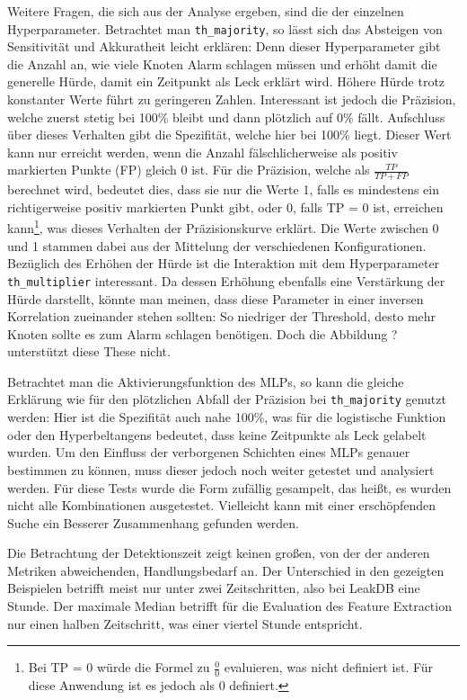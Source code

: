 Weitere Fragen, die sich aus der Analyse ergeben, sind die der einzelnen Hyperparameter. Betrachtet man
 \texttt{th\_majority}, so lässt sich das Absteigen von Sensitivität und Akkuratheit leicht erklären: Denn dieser
 Hyperparameter gibt die Anzahl an, wie viele Knoten Alarm schlagen müssen und erhöht damit die generelle Hürde,
 damit ein Zeitpunkt als Leck erklärt wird. Höhere Hürde trotz konstanter Werte führt zu geringeren Zahlen.
 Interessant ist jedoch die Präzision, welche zuerst stetig bei 100\% bleibt und dann plötzlich auf 0\%
 fällt. Aufschluss über dieses Verhalten gibt die Spezifität, welche hier bei 100\% liegt. Dieser Wert kann
 nur erreicht werden, wenn die Anzahl fälschlicherweise als positiv markierten Punkte (FP) gleich 0 ist.
 Für die Präzision, welche als $\frac{TP}{TP+FP}$ berechnet wird, bedeutet dies, dass sie nur die Werte 1, falls
 es mindestens ein richtigerweise positiv markierten Punkt gibt, oder 0, falls TP = 0 ist, erreichen
 kann\footnote{Bei TP = 0 würde die Formel zu $\frac{0}{0}$ evaluieren, was nicht definiert ist. Für diese Anwendung
 ist es jedoch als 0 definiert.}, was dieses Verhalten der Präzisionskurve erklärt. Die Werte zwischen 0 und 1
 stammen dabei aus der Mittelung der verschiedenen Konfigurationen. Bezüglich des Erhöhen der Hürde ist die
 Interaktion mit dem Hyperparameter \texttt{th\_multiplier} interessant. Da dessen Erhöhung ebenfalls eine
 Verstärkung der Hürde darstellt, könnte man meinen, dass diese Parameter in einer inversen Korrelation
 zueinander stehen sollten: So niedriger der Threshold, desto mehr Knoten sollte es zum Alarm schlagen
 benötigen. Doch die Abbildung ? unterstützt diese These nicht.

Betrachtet man die Aktivierungsfunktion des MLPs, so kann die gleiche Erklärung wie für den plötzlichen Abfall
 der Präzision bei \texttt{th\_majority} genutzt werden: Hier ist die Spezifität auch nahe 100\%, was für die
 logistische Funktion oder den Hyperbeltangens bedeutet, dass keine Zeitpunkte als Leck gelabelt wurden. Um
 den Einfluss der verborgenen Schichten eines MLPs genauer bestimmen zu können, muss dieser jedoch noch weiter
 getestet und analysiert werden. Für diese Tests wurde die Form zufällig gesampelt, das heißt, es wurden nicht
 alle Kombinationen ausgetestet. Vielleicht kann mit einer erschöpfenden Suche ein Besserer Zusammenhang
 gefunden werden.

Die Betrachtung der Detektionszeit zeigt keinen großen, von der der anderen Metriken abweichenden,
 Handlungsbedarf an. Der Unterschied in den gezeigten Beispielen betrifft meist nur unter zwei Zeitschritten,
 also bei LeakDB eine Stunde. Der maximale Median betrifft für die Evaluation des Feature Extraction nur einen
 halben Zeitschritt, was einer viertel Stunde entspricht.

